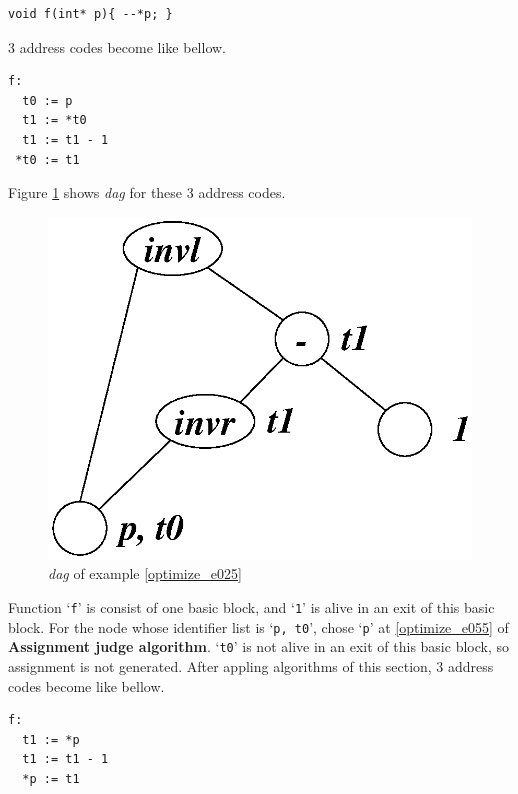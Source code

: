 \begin{Example}
\label{optimize_e025}
\begin{verbatim}
void f(int* p){ --*p; }
\end{verbatim}
3 address codes become like bellow.
\begin{verbatim}
f:
  t0 := p
  t1 := *t0
  t1 := t1 - 1
 *t0 := t1
\end{verbatim}
Figure \ref{optimize_e026} shows {\em dag} for these 3 address codes.
\begin{figure}[htbp]
\begin{center}
\includegraphics[width=0.7\linewidth,height=0.552\linewidth]{opt011.eps}
\caption{{\em dag} of example \ref{optimize_e025}}
\label{optimize_e026}
\end{center}
\end{figure}
Function `{\tt{f}}' is consist of one basic block, and 
`{\tt{1}}' is alive in an exit of this basic block.
For the node whose identifier list is `{\tt{p, t0}}',
chose `{\tt{p}}' at \ref{optimize_e055} of {\bf Assignment judge
 algorithm}.
`{\tt{t0}}' is not alive in an exit of this basic block, so
assignment is not generated.
After appling algorithms of this section,
3 address codes become like bellow.
\begin{verbatim}
f:
  t1 := *p
  t1 := t1 - 1
  *p := t1
\end{verbatim}
\end{Example}

